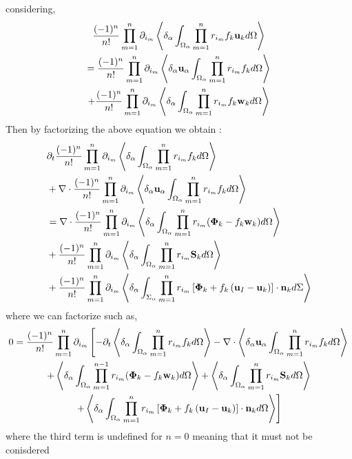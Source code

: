 considering, 
\begin{multline}
    \expo{f_k \textbf{u}_k}\\
    =     \expoU{f_k }\\
    +     \expo{f_k \textbf{w}_k}
\end{multline}
Then by factorizing the above equation we obtain : 
\begin{align}
    & \pddt \expo{f_k} \\
    &+ \nablabh \cdot \expoU{f_k}\\
    &= \nablabh \cdot \expo{(\mathbf{\Phi}_k - f_k \textbf{w}_k)}\\
    &+ \expo{ \textbf{S}_k}\\
    &+ \expoS{\left[
        \mathbf{\Phi}_k
        + f_k
        \left(
            \textbf{u}_I
            - \textbf{u}_k
        \right)
    \right]
    \cdot \textbf{n}_k} \\
\end{align}
where we can factorize such as, 
\begin{multline}
    0 = \frac{(-1)^n}{n!}
    \partialp{1}{n}
    \left[
        - \partial_t
        \pavg{\int_{\Omega_\alpha} \pri{1}{n}f_k d\Omega}
        - \nablab \cdot \pavg{\textbf{u}_\alpha \int_{\Omega_\alpha} \pri{1}{n}f_k d\Omega}
    \right.\\\left.
        +\pavg{\int_{\Omega_\alpha} \pri{1}{n-1} (\mathbf{\Phi}_k - f_k \textbf{w}_k) d\Omega}
        +\pavg{\int_{\Omega_\alpha} \pri{1}{n} \textbf{S}_k d\Omega}
        \right.\\\left.
        +\pavg{\int_{\Omega_\alpha} \pri{1}{n} \left[
            \mathbf{\Phi}_k
            + f_k
            \left(
                \textbf{u}_I
                - \textbf{u}_k
            \right)
        \right]
        \cdot \textbf{n}_kd\Omega}
    \right]
\end{multline}
where the third term is undefined for $n=0$ meaning that it must not be conisdered